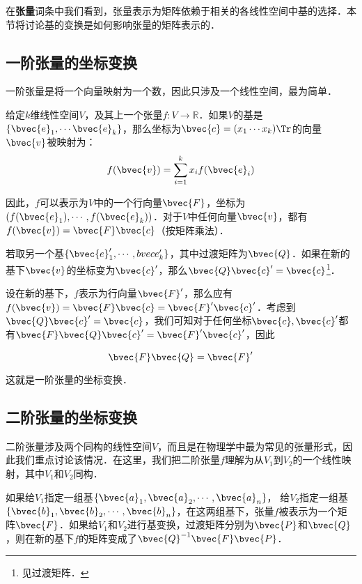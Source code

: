 

在\textbf{张量}词条中我们看到，张量表示为矩阵依赖于相关的各线性空间中基的选择．本节将讨论基的变换是如何影响张量的矩阵表示的．

\subsection{一阶张量的坐标变换}
一阶张量是将一个向量映射为一个数，因此只涉及一个线性空间，最为简单．

给定$k$维线性空间$V$，及其上一个张量$f:V\rightarrow\mathbb{R}$．如果$V$的基是$\{\bvec{e}_1, \cdots\bvec{e}_k\}$，那么坐标为$\bvec{c}=(x_1\cdots x_k)\Tr$的向量$\bvec{v}$被映射为：
\begin{equation}
f(\bvec{v})=\sum\limits_{i=1}^k x_if(\bvec{e}_i)
\end{equation}

因此，$f$可以表示为$V$中的一个行向量$\bvec{F}$，坐标为$(f(\bvec{e}_1), \cdots, f(\bvec{e}_k))$．对于$V$中任何向量$\bvec{v}$，都有$f(\bvec{v})=\bvec{F}\bvec{c}$（按矩阵乘法）．

若取另一个基$\{\bvec{e}_1', \cdots, \\bvec{e}_k'\}$，其中过渡矩阵为$\bvec{Q}$．如果在新的基下$\bvec{v}$的坐标变为$\bvec{c}'$，那么$\bvec{Q}\bvec{c}'=\bvec{c}$\footnote{见过渡矩阵．}．

设在新的基下，$f$表示为行向量$\bvec{F}'$，那么应有$f(\bvec{v})=\bvec{F}\bvec{c}=\bvec{F}'\bvec{c}'$．考虑到$\bvec{Q}\bvec{c}'=\bvec{c}$，我们可知对于任何坐标$\bvec{c}, \bvec{c}'$都有$\bvec{F}\bvec{Q}\bvec{c}'=\bvec{F}'\bvec{c}'$，因此

\begin{equation}
\bvec{F}\bvec{Q}=\bvec{F}'
\end{equation}

这就是一阶张量的坐标变换．
\subsection{二阶张量的坐标变换}

二阶张量涉及两个同构的线性空间$V$，而且是在物理学中最为常见的张量形式，因此我们重点讨论该情况．在这里，我们把二阶张量$f$理解为从$V_1$到$V_2$的一个线性映射，其中$V_1$和$V_2$同构．

如果给$V_1$指定一组基$\{\bvec{a}_1, \bvec{a}_2, \cdots, \bvec{a}_n\}$， 给$V_2$指定一组基$\{\bvec{b}_1, \bvec{b}_2, \cdots, \bvec{b}_n\}$，在这两组基下，张量$f$被表示为一个矩阵$\bvec{F}$．如果给$V_1$和$V_2$进行基变换，过渡矩阵分别为$\bvec{P}$和$\bvec{Q}$，则在新的基下$f$的矩阵变成了$\bvec{Q}^{-1}\bvec{F}\bvec{P}$．








